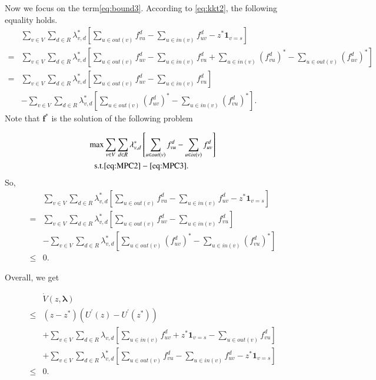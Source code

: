 \documentclass[10pt,conference]{IEEEtran}
\begin{document}
Now we focus on the term\eqref{eq:bound3}. According to \eqref{eq:kkt2},
the following equality holds.
\begin{align*}
 & \sum_{v\in V}\sum_{d\in R}\lambda_{v,d}^{*}\left[\sum_{u\in out(v)}f_{vu}^{d}-\sum_{u\in in(v)}f_{uv}^{d}-z^{*}\mathbf{1}_{v=s}\right]\\
= & \sum_{v\in V}\sum_{d\in R}\lambda_{v,d}^{*}\left[\sum_{u\in out(v)}f_{uv}^{d}-\sum_{u\in in(v)}f_{vu}^{d}+\sum_{u\in in(v)}(f_{vu}^{d})^{*}-\sum_{u\in out(v)}(f_{uv}^{d})^{*}\right]\\
= & \sum_{v\in V}\sum_{d\in R}\lambda_{v,d}^{*}\left[\sum_{u\in out(v)}f_{uv}^{d}-\sum_{u\in in(v)}f_{vu}^{d}\right]\\
 & -\sum_{v\in V}\sum_{d\in R}\lambda_{v,d}^{*}\left[\sum_{u\in out(v)}(f_{uv}^{d})^{*}-\sum_{u\in in(v)}(f_{vu}^{d})^{*}\right].\end{align*}
Note that $\boldsymbol{f}^{*}$ is the solution of the following problem

\begin{align*}
\max & \sum_{v\in V}\sum_{d\in R}\lambda_{v,d}^{*}\left[\sum_{u\in out(v)}f_{vu}^{d}-\sum_{u\in in(v)}f_{uv}^{d}\right]\\
\mbox{s.t.} & \eqref{eq:MPC2}-\eqref{eq:MPC3}.\end{align*}
So, \begin{align*}
 & \sum_{v\in V}\sum_{d\in R}\lambda_{v,d}^{*}\left[\sum_{u\in out(v)}f_{vu}^{d}-\sum_{u\in in(v)}f_{uv}^{d}-z^{*}\mathbf{1}_{v=s}\right]\\
= & \sum_{v\in V}\sum_{d\in R}\lambda_{v,d}^{*}\left[\sum_{u\in out(v)}f_{uv}^{d}-\sum_{u\in in(v)}f_{vu}^{d}\right]\\
 & -\sum_{v\in V}\sum_{d\in R}\lambda_{v,d}^{*}\left[\sum_{u\in out(v)}(f_{uv}^{d})^{*}-\sum_{u\in in(v)}(f_{vu}^{d})^{*}\right]\\
\leq & 0.\end{align*}


Overall, we get

\begin{align*}
 & \dot{V}(z,\boldsymbol{\lambda})\\
\leq & (z-z^{*})\left(U^{'}(z)-U^{'}(z^{*})\right)\\
 & +\sum_{v\in V}\sum_{d\in R}\lambda_{v,d}\left[\sum_{u\in in(v)}f_{uv}^{d}+z^{*}\mathbf{1}_{v=s}-\sum_{u\in out(v)}f_{vu}^{d}\right]\\
 & +\sum_{v\in V}\sum_{d\in R}\lambda_{v,d}^{*}\left[\sum_{u\in out(v)}f_{vu}^{d}-\sum_{u\in in(v)}f_{uv}^{d}-z^{*}\mathbf{1}_{v=s}\right]\\
\leq & 0.\end{align*}
\end{document}
